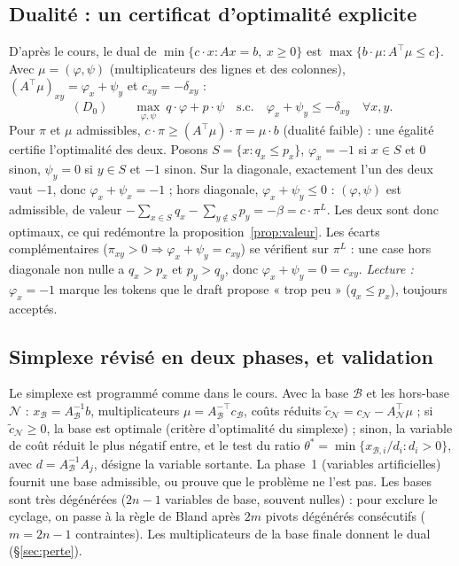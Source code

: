 \documentclass[11pt,a4paper]{article}
\newcommand{\cB}{\mathcal{B}}
\newcommand{\cN}{\mathcal{N}}
\theoremstyle{plain}
\begin{document}
\subsection{Dualité : un certificat d'optimalité explicite}\label{sec:dualite}
D'après le cours, le dual de $\min\{c\cdot x:Ax=b,\ x\ge0\}$ est $\max\{b\cdot\mu:A^\top\mu\le c\}$. Avec $\mu=(\varphi,\psi)$ (multiplicateurs des lignes et des colonnes), $(A^\top\mu)_{xy}=\varphi_x+\psi_y$ et $c_{xy}=-\delta_{xy}$ :
\[(D_0)\qquad \max_{\varphi,\psi}\ q\cdot\varphi+p\cdot\psi\quad\text{s.c.}\quad \varphi_x+\psi_y\le-\delta_{xy}\quad\forall x,y.\]
Pour $\pi$ et $\mu$ admissibles, $c\cdot\pi\ge(A^\top\mu)\cdot\pi=\mu\cdot b$ (dualité faible) : une égalité certifie l'optimalité des deux.
Posons $S=\{x:q_x\le p_x\}$, $\varphi_x=-1$ si $x\in S$ et $0$ sinon, $\psi_y=0$ si $y\in S$ et $-1$ sinon. Sur la diagonale, exactement l'un des deux vaut $-1$, donc $\varphi_x+\psi_x=-1$ ; hors diagonale, $\varphi_x+\psi_y\le0$ : $(\varphi,\psi)$ est admissible, de valeur $-\sum_{x\in S}q_x-\sum_{y\notin S}p_y=-\beta=c\cdot\pi^L$. Les deux sont donc optimaux, ce qui redémontre la proposition~\ref{prop:valeur}.
Les écarts complémentaires ($\pi_{xy}>0\Rightarrow\varphi_x+\psi_y=c_{xy}$) se vérifient sur $\pi^L$ : une case hors diagonale non nulle a $q_x>p_x$ et $p_y>q_y$, donc $\varphi_x+\psi_y=0=c_{xy}$. \emph{Lecture :} $\varphi_x=-1$ marque les tokens que le draft propose « trop peu » ($q_x\le p_x$), toujours acceptés.

\subsection{Simplexe révisé en deux phases, et validation}\label{sec:simplexe}
Le simplexe est programmé comme dans le cours. Avec la base $\cB$ et les hors-base $\cN$ : $x_\cB=A_\cB^{-1}b$, multiplicateurs $\mu=A_\cB^{-\top}c_\cB$, coûts réduits $\tilde c_\cN=c_\cN-A_\cN^\top\mu$ ; si $\tilde c_\cN\ge0$, la base est optimale (critère d'optimalité du simplexe) ; sinon, la variable de coût réduit le plus négatif entre, et le test du ratio $\theta^*=\min\{x_{\cB,i}/d_i:d_i>0\}$, avec $d=A_\cB^{-1}A_j$, désigne la variable sortante. La phase~1 (variables artificielles) fournit une base admissible, ou prouve que le problème ne l'est pas. Les bases sont très dégénérées ($2n-1$ variables de base, souvent nulles) : pour exclure le cyclage, on passe à la règle de Bland après $2m$ pivots dégénérés consécutifs ($m=2n-1$ contraintes). Les multiplicateurs de la base finale donnent le dual (§\ref{sec:perte}).
\end{document}
